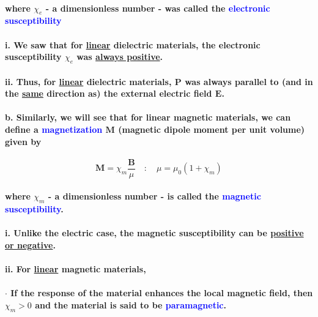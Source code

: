 \documentclass{article}
\begin{document}
\paragraph{where $\chi_e$ - a dimensionless number - was called the \textcolor{blue}{electronic susceptibility}}
\paragraph{\indent\indent i. We saw that for \underline{linear} dielectric materials, the electronic susceptibility $\chi_e$ was \underline{always positive}.}
\paragraph{\indent\indent ii. Thus, for \underline{linear} dielectric materials, $\boldsymbol{P}$ was always parallel to (and in the \underline{same} direction as) the external electric field $\boldsymbol{E}$.}
\paragraph{\indent b. Similarly, we will see that for linear magnetic materials, we can define a \textcolor{blue}{magnetization} $\boldsymbol{M}$ (magnetic dipole moment per unit volume) given by}
\begin{equation*}
    \boldsymbol{M}=\chi_m\frac{\boldsymbol{B}}{\mu}\quad:\quad \mu=\mu_0(1+\chi_m)
\end{equation*}
\paragraph{where $\chi_m$ - a dimensionless number - is called the \textcolor{blue}{magnetic susceptibility}.}
\paragraph{\indent\indent i. Unlike the electric case, the magnetic susceptibility can be \underline{positive or negative}.}
\paragraph{\indent\indent ii. For \underline{linear} magnetic materials,}
\paragraph{\indent\indent $\cdot$ If the response of the material enhances the local magnetic field, then $\chi_m>0$ and the material is said to be \textcolor{blue}{paramagnetic}.}
\end{document}
